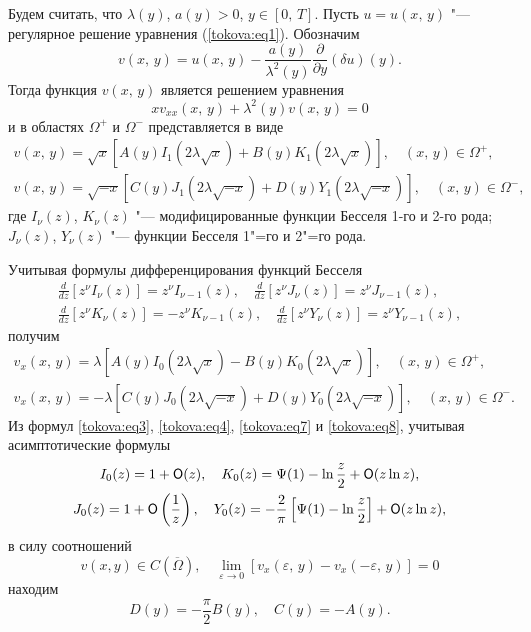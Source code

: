  Будем считать, что $\lambda(y)$, $a(y)>0$, $y\in[0,\,T]$. Пусть $u=u(x,\,y)$ "--- регулярное решение
уравнения (\ref{tokova:eq1}). Обозначим 
\begin{equation}
\label{tokova:eq2}
v(x,\,y)=u(x,\,y)-\frac{a(y)}{\lambda^2(y)}\frac{\partial}{\partial y}(\delta u)(y).
\end{equation}
Тогда функция $v(x,\,y)$ является решением уравнения
\[
x v_{xx}(x,\,y)+\lambda^2(y) v(x,\,y)=0
\]
и в областях $\Omega^{+}$ и $\Omega^{-}$ представляется в виде
\begin{gather}
\label{tokova:eq3}
v(x,\,y) = \sqrt x \left[A(y)I_1 (2\lambda \sqrt{x})+B(y)K_1 (2\lambda \sqrt{x})\right],\quad (x,\,y)\in\Omega^{+},\\
\label{tokova:eq4}
v(x,\,y)=\sqrt{-x}\left[C(y)J_1(2\lambda \sqrt{-x})+D(y)Y_1 (2\lambda \sqrt{-x})\right],\quad (x,\,y)\in\Omega^{-},
\end{gather}
где $I_\nu(z)$, $K_\nu(z)$ "--- модифицированные функции Бесселя 1-го и 2-го рода;
$J_\nu(z)$, $Y_\nu(z)$ "--- функции Бесселя 1"=го и 2"=го рода.

Учитывая формулы дифференцирования функций Бесселя
\begin{gather}
\label{tokova:eq5}
\frac{d}{dz}\left[z^\nu I_\nu(z)\right]=z^\nu I_{\nu-1}(z), \quad
\frac{d}{dz}\left[z^\nu J_\nu(z)\right]=z^\nu J_{\nu-1}(z), \\
\label{tokova:eq6}
\frac{d}{dz}\left[z^\nu K_\nu(z)\right]=-z^\nu
K_{\nu-1}(z), \quad \frac{d}{dz}\left[z^\nu Y_\nu(z)\right]=z^\nu Y_{\nu-1}(z),
\end{gather}
получим
\begin{gather}
\label{tokova:eq7}
v_x (x,\,y)=\lambda \left[A(y)I_0(2 \lambda \sqrt{x})- B(y)K_0(2 \lambda \sqrt{x}) \right],\quad (x,\,y)\in\Omega^{+},\\
\label{tokova:eq8}
v_x(x,\,y)=-\lambda \left[C(y)J_0 (2\lambda \sqrt{-x})  + D(y)Y_0 (2 \lambda \sqrt{-x})\right],\quad (x,\,y)\in\Omega^{-}.
\end{gather}
Из формул \eqref{tokova:eq3}, \eqref{tokova:eq4}, \eqref{tokova:eq7} и \eqref{tokova:eq8}, учитывая асимптотические формулы
\begin{gather*}
I_0(z)=1+{\sf O}(z), \quad K_0(z)=\Psi(1)-\ln\frac{z}{2}+{\sf O}(z\ln z),\\
J_0(z)=1+{\sf O}\left(\frac{1}{z}\right), \quad Y_0(z)=-\frac 2\pi\left[\Psi(1)-\ln\frac{z}{2}\right]+{\sf O}(z\ln z),
\end{gather*}
в силу соотношений
\[
v(x,y)\in C(\overline\Omega),\quad\lim \limits_{\varepsilon \rightarrow 0}
[v_x(\varepsilon,\,y)-v_x(-\varepsilon,\,y)]=0
\]
находим
\begin{equation}
\label{tokova:eq9}
D(y)=-\frac {\pi}{2}B(y),\quad C(y)=-A(y).
\end{equation}


